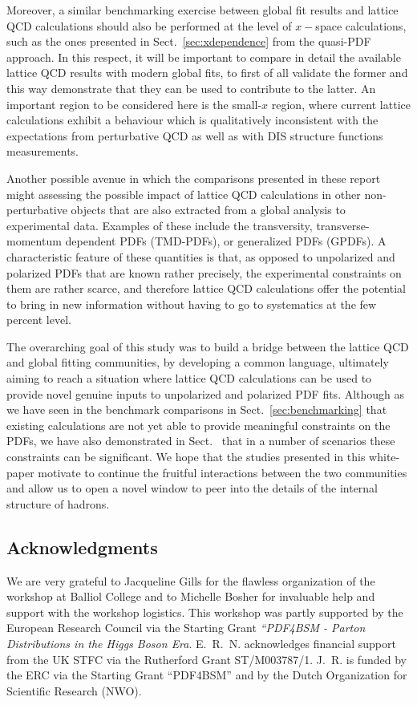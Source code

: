 Moreover, a similar benchmarking exercise between global fit results and lattice
QCD calculations should also be performed at the level of
$x-$space calculations, such as the ones presented in Sect.~\ref{sec:xdependence}
from the quasi-PDF approach.
%
In this respect, it will be important to compare in detail the available lattice
QCD results with modern global fits, to first of all validate the former and
this way demonstrate that they can be used to contribute to the latter.
%
An important region to be considered here is the small-$x$ region, where current lattice
calculations exhibit a behaviour which is qualitatively inconsistent with
the expectations from perturbative QCD as well as with DIS structure functions measurements.

Another possible avenue in which the comparisons presented in these report might assessing
the possible impact of lattice QCD calculations in other non-perturbative objects that
are also extracted from a global analysis to experimental data.
%
Examples of these include the transversity, transverse-momentum dependent PDFs (TMD-PDFs),
or generalized PDFs (GPDFs).
%
A characteristic feature of these quantities is that, as opposed to unpolarized and
polarized PDFs that are known rather precisely, the experimental constraints on them
are rather scarce, and therefore lattice QCD calculations offer the potential
to bring in new information without having to go to systematics at the few percent level.

The overarching goal of this study was to build a bridge between the lattice QCD
and global fitting communities, by developing a common language, ultimately
aiming to reach a situation where
lattice QCD calculations can be used to provide novel genuine inputs
to unpolarized and polarized PDF fits.
%
Although as we have seen in the benchmark comparisons in Sect.~\ref{sec:benchmarking} that
existing calculations are not yet able to provide meaningful constraints on the
PDFs, we have also demonstrated in Sect.~\label{sec:projections} that in a number
of scenarios these constraints can be significant.
%
We hope that the studies presented in this white-paper motivate to continue the fruitful
interactions between the two communities and allow us to open a novel window
to peer into the details of the internal structure of hadrons.


\subsection*{Acknowledgments}

We are very grateful to Jacqueline Gills for the flawless organization
of the workshop at Balliol College and to Michelle Bosher for
invaluable help and support with the workshop logistics.
%
This workshop was partly supported by the European Research Council via
the Starting Grant {\it ``PDF4BSM - Parton Distributions in the
  Higgs Boson Era}.
%
E.~R.~N. acknowledges financial support from the
UK STFC via the Rutherford Grant ST/M003787/1.
%
J.~R. is funded by the ERC via the Starting Grant ``PDF4BSM'' and by the
Dutch Organization for Scientific Research (NWO).
